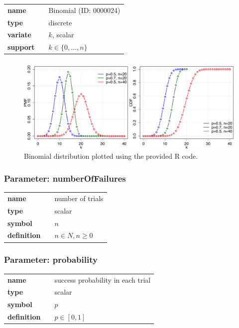 \documentclass{article}
\begin{document}
  \bigskip 

\begin{tabular}{p{2cm}cl}
\textbf{name} & & Binomial (ID: 0000024)\\ 
 
\textbf{type} & & discrete \\ 

\textbf{variate} & & $k$, scalar \\ 

\textbf{support} & & $k \in \{0,\dots,n\}$
\end{tabular}

\begin{figure}[ht!]
\centering
  \includegraphics[width=140mm]{pics/Binomial.pdf}
 \caption{Binomial distribution plotted using the provided R code.}
 \label{fig:Binomial}
\end{figure}

\subsubsection*{Parameter: numberOfFailures}

\noindent\begin{tabular}{p{2cm}cl}
\textbf{name} & & number of trials \\
\textbf{type} & & scalar \\
\textbf{symbol} & & $n$  \\
\textbf{definition} & & $n \in N, n \ge 0$
\end{tabular}
\subsubsection*{Parameter: probability}

\noindent\begin{tabular}{p{2cm}cl}
\textbf{name} & & success probability in each trial \\
\textbf{type} & & scalar \\
\textbf{symbol} & & $p$  \\
\textbf{definition} & & $p \in [0,1]$
\end{tabular}
\end{document}
